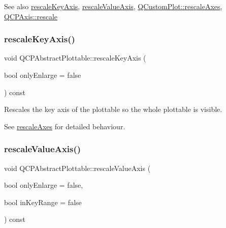 \begin{DoxySeeAlso}{See also}
\hyperlink{class_q_c_p_abstract_plottable_ae96b83c961e257da116c6acf9c7da308}{rescale\+Key\+Axis}, \hyperlink{class_q_c_p_abstract_plottable_a714eaf36b12434cd71846215504db82e}{rescale\+Value\+Axis}, \hyperlink{class_q_custom_plot_ad86528f2cee6c7e446dea4a6e8839935}{Q\+Custom\+Plot\+::rescale\+Axes}, \hyperlink{class_q_c_p_axis_a499345f02ebce4b23d8ccec96e58daa9}{Q\+C\+P\+Axis\+::rescale} 
\end{DoxySeeAlso}
\mbox{\label{class_q_c_p_abstract_plottable_ae96b83c961e257da116c6acf9c7da308}} 
\subsubsection{\texorpdfstring{rescale\+Key\+Axis()}{rescaleKeyAxis()}}
{\footnotesize\ttfamily void Q\+C\+P\+Abstract\+Plottable\+::rescale\+Key\+Axis (\begin{DoxyParamCaption}\item[{bool}]{only\+Enlarge = {\ttfamily false} }\end{DoxyParamCaption}) const}

Rescales the key axis of the plottable so the whole plottable is visible.

See \hyperlink{class_q_c_p_abstract_plottable_a1491c4a606bccd2d09e65e11b79eb882}{rescale\+Axes} for detailed behaviour. \mbox{\label{class_q_c_p_abstract_plottable_a714eaf36b12434cd71846215504db82e}} 
\subsubsection{\texorpdfstring{rescale\+Value\+Axis()}{rescaleValueAxis()}}
{\footnotesize\ttfamily void Q\+C\+P\+Abstract\+Plottable\+::rescale\+Value\+Axis (\begin{DoxyParamCaption}\item[{bool}]{only\+Enlarge = {\ttfamily false},  }\item[{bool}]{in\+Key\+Range = {\ttfamily false} }\end{DoxyParamCaption}) const}

